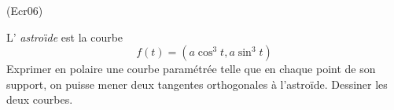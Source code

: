 \begin{tiny}(Ecr06)\end{tiny}
L' \emph{astro{\"\i}de} est la courbe
\[f(t)=(a\cos^3 t, a\sin^3 t)\]
Exprimer en polaire une courbe paramétrée telle que en chaque point de son support, on puisse mener deux tangentes orthogonales à l'astroïde. Dessiner les deux courbes.